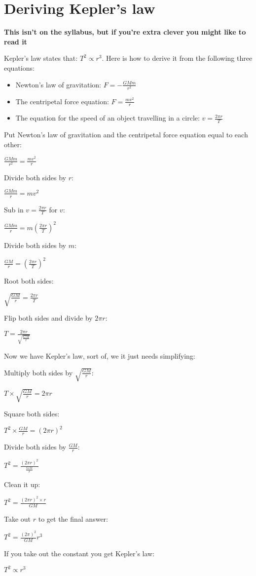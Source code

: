 \documentclass{article}
\begin{document}
\section*{Deriving Kepler's law}
\textbf{This isn't on the syllabus, but if you're extra clever you might like to read it}

Kepler's law states that: $T^2 \propto r^3$. Here is how to derive it from the following three equations:

\begin{itemize}

\item Newton's law of gravitation: $F = -\frac{GMm}{r^2}$

\item The centripetal force equation: $F = \frac{mv^2}{r}$

\item The equation for the speed of an object travelling in a circle: $v = \frac{2 \pi r}{T}$

\end{itemize}


Put Newton's law of gravitation and the centripetal force equation equal to each other:

$\frac{GMm}{r^2} = \frac{mv^2}{r}$

Divide both sides by $r$:

$\frac{GMm}{r} = mv^2$

Sub in $v = \frac{2 \pi r}{T}$ for $v$:

$\frac{GMm}{r} = m(\frac{2 \pi r}{T})^2$

Divide both sides by $m$:

$\frac{GM}{r} = (\frac{2 \pi r}{T})^2$

Root both sides:

$\sqrt{\frac{GM}{r}} = \frac{2 \pi r}{T}$

Flip both sides and divide by $2 \pi r$:

$T = \frac{2 \pi r}{\sqrt{\frac{GM}{r}}}$

Now we have Kepler's law, sort of, we it just needs simplifying:

Multiply both sides by $\sqrt{\frac{GM}{r}}$:

$T \times \sqrt{\frac{GM}{r}} = 2 \pi r$

Square both sides:

$T^2 \times \frac{GM}{r} = (2 \pi r)^2$

Divide both sides by $\frac{GM}{r}$:

$T^2 = \frac{(2 \pi r)^2}{\frac{GM}{r}}$

Clean it up:

$T^2 = \frac{(2 \pi r)^2 \times r}{GM}$

Take out $r$ to get the final answer:

$T^2 = \frac{(2 \pi)^2}{GM}r^3$

If you take out the constant you get Kepler's law:

$T^2 \propto r^3$
\end{document}
